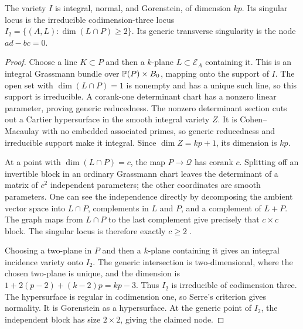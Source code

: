 \begin{lemma}\label{D:source}
The variety $I$ is integral, normal, and Gorenstein, of dimension $kp$. Its singular locus is the irreducible codimension-three locus $I_2=\{(A,L):\dim(L\cap P)\ge2\}$. Its generic transverse singularity is the node $ad-bc=0$.
\end{lemma}
\begin{proof}
Choose a line $K\subset P$ and then a $k$-plane $L\subset\mathcal E_A$ containing it. This is an integral Grassmann bundle over $\mathbb P(P)\times B_0$, mapping onto the support of $I$. The open set with $\dim(L\cap P)=1$ is nonempty and has a unique such line, so this support is irreducible. A corank-one determinant chart has a nonzero linear parameter, proving generic reducedness. The nonzero determinant section cuts out a Cartier hypersurface in the smooth integral variety $Z$. It is Cohen--Macaulay with no embedded associated primes, so generic reducedness and irreducible support make it integral. Since $\dim Z=kp+1$, its dimension is $kp$.

At a point with $\dim(L\cap P)=c$, the map $P\to\mathcal Q$ has corank $c$. Splitting off an invertible block in an ordinary Grassmann chart leaves the determinant of a matrix of $c^2$ independent parameters; the other coordinates are smooth parameters. One can see the independence directly by decomposing the ambient vector space into $L\cap P$, complements in $L$ and $P$, and a complement of $L+P$. The graph maps from $L\cap P$ to the last complement give precisely that $c\times c$ block. The singular locus is therefore exactly $c\ge2$ \cite{BV88,BH93}.

Choosing a two-plane in $P$ and then a $k$-plane containing it gives an integral incidence variety onto $I_2$. The generic intersection is two-dimensional, where the chosen two-plane is unique, and the dimension is $1+2(p-2)+(k-2)p=kp-3$. Thus $I_2$ is irreducible of codimension three. The hypersurface is regular in codimension one, so Serre's criterion gives normality. It is Gorenstein as a hypersurface. At the generic point of $I_2$, the independent block has size $2\times2$, giving the claimed node.
\end{proof}

